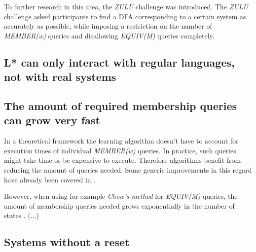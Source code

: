 \documentclass[multi,crop=false,class=article]{standalone}
\begin{document}
To further research in this area, the \textit{ZULU} challenge was introduced.
The \textit{ZULU} challenge asked participants to find a DFA corresponding
to a certain system as accurately as possible, while imposing a restriction
on the number of \textit{MEMBER(w)} queries and disallowing \textit{EQUIV(M)}
queries completely.

\subsection{L* can only interact with regular languages, not with real systems}

\subsection{The amount of required membership queries can grow very fast}
In a theoretical framework the learning algorithm doesn't have to account
for execution times of individual \textit{MEMBER(w)} queries.
In practice, such queries might take time or be expensive to execute.
Therefore algorithms benefit from reducing the amount of queries needed.
Some generic improvements in this regard have already been covered in
.

However, when using for example \textit{Chow's method} for \textit{EQUIV(M)}
queries, the amount of membership queries needed grows exponentially
in the number of states .
(...)

\subsection{Systems without a reset}
\end{document}
